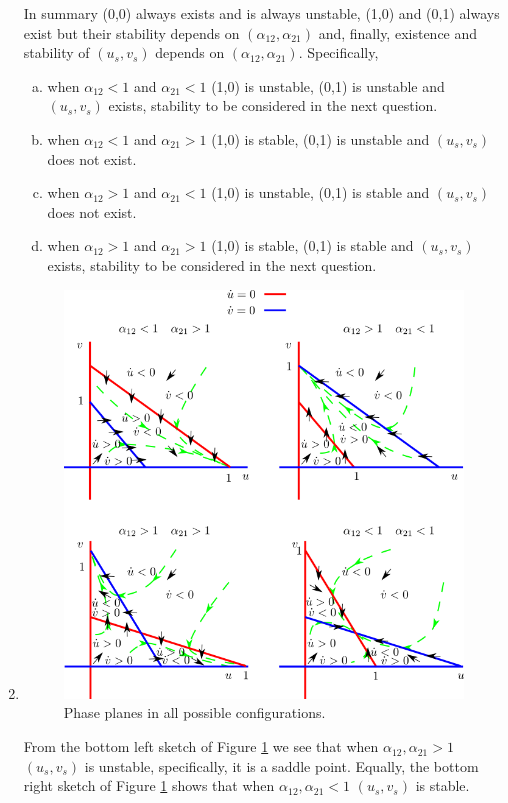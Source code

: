 \documentclass[10pt]{article}
\newcommand{\fig}[1]{Figure \ref{#1}}
\newcommand{\tp}{.8\textwidth}
\begin{document}
\begin{Answ}
\begin{enumerate}
In summary (0,0) always exists and is always unstable, (1,0) and (0,1) always exist but their stability depends on $(\alpha_{12},\alpha_{21})$ and, finally, existence and stability of $(u_s,v_s)$ depends on $(\alpha_{12},\alpha_{21})$. Specifically,
\begin{enumerate}[(a)]
\item when $\alpha_{12}<1$ and $\alpha_{21}<1$ (1,0) is unstable, (0,1) is unstable and $(u_s, v_s)$ exists, stability to be considered in the next question.
\item when $\alpha_{12}<1$ and $\alpha_{21}>1$ (1,0) is stable, (0,1) is unstable and $(u_s,v_s)$ does not exist.
\item when $\alpha_{12}>1$ and $\alpha_{21}<1$ (1,0) is unstable, (0,1) is stable and $(u_s,v_s)$ does not exist.
\item when $\alpha_{12}>1$ and $\alpha_{21}>1$ (1,0) is stable, (0,1) is stable and $(u_s, v_s)$ exists, stability to be considered in the next question.
\end{enumerate}

\item 
\begin{figure}[h!!!tb]
\centering
\includegraphics[width=\tp]{../../Pictures/Competitive_exclusion.png}
\caption{Phase planes in all possible configurations.\label{Phase_plane}}
\end{figure}
From the bottom left sketch of \fig{Phase_plane} we see that when $\alpha_{12},\alpha_{21}>1$ $(u_s,v_s)$ is unstable, specifically, it is a saddle point. Equally, the bottom right sketch of \fig{Phase_plane} shows that when $\alpha_{12},\alpha_{21}<1$ $(u_s,v_s)$ is stable.


\end{enumerate}
\end{Answ}
\end{document}
